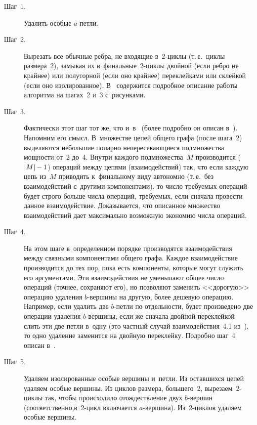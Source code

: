 \begin{multicols}{2}
  \begin{description}
  \item[Шаг~1.] Удалить особые $a$-петли. 
  \item[Шаг~2.] Вырезать все обычные реб\-ра, не входящие в~2-цик\-лы (т.\,е.\ 
циклы размера~2), замыкая их в~финальные~2-цик\-лы двойной (если ребро не 
крайнее) или полуторной (если оно крайнее) переклейками или склейкой (если 
оно изолированное). В~\cite[п.~4]{1-gor} содержится подробное описание 
работы алгоритма на шагах~2 и~3 с~рисунками.
  \item[Шаг~3.] Фактически этот шаг тот же, что и~в~\cite{2-gor} (более 
подробно он описан в~\cite[п.~4]{1-gor}). Напомним его смысл. В~множестве 
цепей общего графа (после шага~2) выделяются небольшие попарно 
непересекающиеся подмножества мощ\-ности от~2 до~4. Внутри каждого 
подмножества~$M$ производится ($\vert M\vert \hm-1$) операций между 
цепями (взаимодействий) так, что если каждую цепь из~$M$ приводить 
к~финальному виду автономно (т.\,е.\ без взаимодействий с~другими 
компонентами), то число требуемых операций будет строго больше числа 
операций, тре\-бу\-емых, если сначала провести данное взаимодействие. 
Доказывается, что описанное множество взаимодействий дает максимально 
возможную экономию числа операций.
  \item[Шаг~4.] На этом шаге в~определенном порядке производятся 
взаимодействия между связными компонентами общего графа. Каждое 
взаимодействие производится до тех пор, пока есть компоненты, которые могут 
служить его аргументами. Эти взаимодействия не уменьшают общее число 
операций (точнее, сохраняют его), но позволяют заменить <<дорогую>> 
операцию удаления $b$-вер\-ши\-ны на другую, более дешевую операцию. 
Например, если удалить две $b$-пет\-ли по отдельности, будет произведено две 
операции удаления $b$-вер\-ши\-ны, если же сначала двойной переклейкой 
слить эти две петли в~одну (это частный случай взаимодействия~4.1  
из~\cite{1-gor}), то одно удаление заменится на двойную переклейку. Подробно 
шаг~4 описан в~\cite[п.~4]{1-gor}.
  \item[Шаг~5.] Удаляем изолированные особые вершины и~петли. Из 
оставшихся цепей удаляем особые вершины. Из циклов размера, большего~2, 
вырезаем~2-цик\-лы так, чтобы происходило отож\-де\-ст\-вле\-ние двух  
$b$-вер\-шин (соответственно,\linebreak в~2-цикл включается $a$-вер\-ши\-на).  
Из~2-цик\-лов удаляем особые вершины.
  \end{description}
  

\end{multicols}
